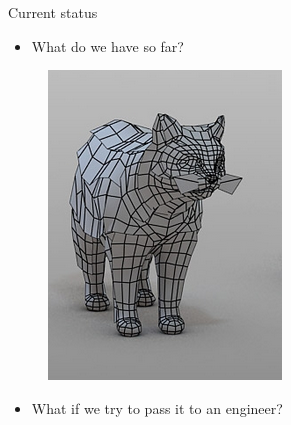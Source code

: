 \newcommand{\norm}[1]{\parallel #1 \parallel_2}

\begin{frame}{Current status}
\begin{minipage}[t]{0.4\linewidth}

\begin{itemize}
\item What do we have so far?
\end{itemize}
\vspace{5mm}
\begin{figure}
\includegraphics[width=0.8\linewidth]{Pictures/cat.png}
\end{figure}
\end{minipage}%
\pause
\begin{minipage}[t]{0.6\linewidth}
\begin{itemize}
\item What if we try to pass it to an engineer?
\end{itemize}


\end{minipage}
\end{frame}
